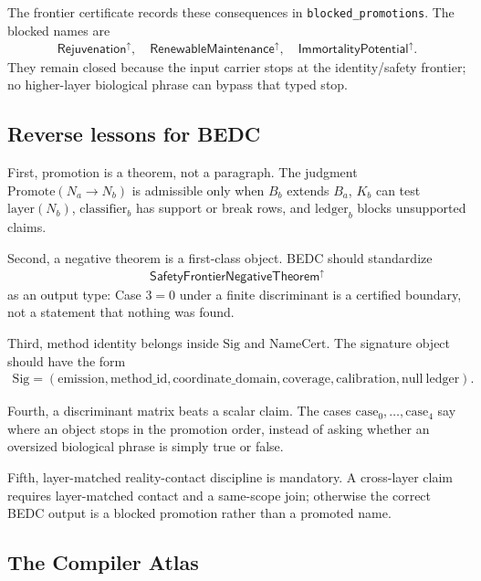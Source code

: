 The frontier certificate records these consequences in \texttt{blocked\_promotions}. The blocked names are
$$
\begin{aligned}
\mathsf{Rejuvenation}^{\uparrow},\quad
\mathsf{RenewableMaintenance}^{\uparrow},\quad
\mathsf{ImmortalityPotential}^{\uparrow}.
\end{aligned}
$$
They remain closed because the input carrier stops at the identity/safety frontier; no higher-layer biological phrase can bypass that typed stop.

\subsection{Reverse lessons for BEDC}

First, promotion is a theorem, not a paragraph. The judgment $\mathrm{Promote}(N_a\to N_b)$ is admissible only when $B_b$ extends $B_a$, $K_b$ can test $\mathrm{layer}(N_b)$, $\mathrm{classifier}_b$ has support or break rows, and $\mathrm{ledger}_b$ blocks unsupported claims.

Second, a negative theorem is a first-class object. BEDC should standardize
$$
\begin{aligned}
\mathsf{SafetyFrontierNegativeTheorem}^{\uparrow}
\end{aligned}
$$
as an output type: Case $3=0$ under a finite discriminant is a certified boundary, not a statement that nothing was found.

Third, method identity belongs inside $\mathrm{Sig}$ and $\mathrm{NameCert}$. The signature object should have the form
$$
\begin{aligned}
\mathrm{Sig}=(\mathrm{emission},\mathrm{method\_id},\mathrm{coordinate\_domain},
\mathrm{coverage},\mathrm{calibration},\mathrm{null\ ledger}).
\end{aligned}
$$

Fourth, a discriminant matrix beats a scalar claim. The cases $\mathrm{case}_0,\ldots,\mathrm{case}_4$ say where an object stops in the promotion order, instead of asking whether an oversized biological phrase is simply true or false.

Fifth, layer-matched reality-contact discipline is mandatory. A cross-layer claim requires layer-matched contact and a same-scope join; otherwise the correct BEDC output is a blocked promotion rather than a promoted name.

\subsection{The Compiler Atlas}

